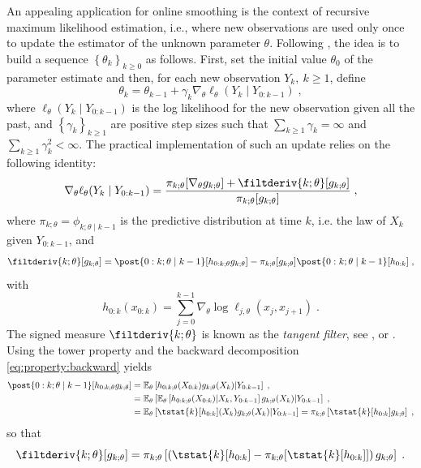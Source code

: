 \documentclass[12pt]{article}
\newcommand{\md}[1]{g_{#1}}
\newcommand{\logllh}[1]{\ell_{#1}}
\newcommand{\pred}[1]{\pi_{#1}}
\newcommand{\parvec}{\theta}
\newcommand{\af}[1]{h_{#1}}
\newcommand{\deriv}{\nabla_{\parvec}}
\newcommand{\eqsp}{\;}
\newcommand{\qg}[1]{\ell_{#1}}
\begin{document}
An appealing application for online smoothing is the context of recursive maximum likelihood estimation, i.e., where new observations are used only once to update the estimator of the unknown parameter $\parvec$. Following \cite{legland1997recursive}, the idea is to build a sequence $\left\lbrace\parvec_k\right\rbrace_{k\geqslant 0}$ as follows. First, set the initial value $\parvec_0$ of the parameter estimate and then, for each new observation $Y_{k},~k\geqslant 1$, define
\begin{equation}
\theta_{k} = \theta_{k-1} + \gamma_k \deriv \logllh{\parvec}(Y_k \mid Y_{0:k - 1}) \eqsp,  \label{eq:RMLE:update}
\end{equation}
where $\logllh{\parvec}(Y_k \mid Y_{0:k - 1})$ is the log likelihood for the new observation given all the past, and $\left\lbrace\gamma_k\right\rbrace_{k\geqslant 1}$ are positive step sizes such that $\sum_{k \geqslant 1}\gamma_k = \infty$ and $\sum_{k \geqslant 1}\gamma_k^2 < \infty$. The practical implementation of such an update relies on the following identity:
\begin{equation}
\deriv \logllh{\parvec}(Y_k \mid Y_{0:k - 1})  
=  \frac{\pred{k;\parvec}[\deriv \md{k;\parvec}] + \filtderiv{k;\parvec}[\md{k;\parvec}]}{\pred{k;\parvec}[\md{k;\parvec}]}\eqsp,
\label{eq:online:gradient}
\end{equation}
where $\pred{k;\parvec} = \phi_{k;\parvec \mid k - 1}$ is the predictive distribution at time $k$, i.e. the law of $X_k$ given $Y_{0:k-1}$,   and 
$$\filtderiv{k;\parvec}[\md{k;\parvec}] = \post{0:k;\parvec \mid k - 1} [\af{0:k;\parvec} \md{k;\parvec}] - \pred{k;\parvec}[\md{k;\parvec}]  \post{0:k;\parvec \mid k - 1 }[\af{0:k}]\eqsp,$$
with
\begin{equation}
\label{eq:complete:gradient:log}
\af{0:k}(x_{0:k}) =  \sum_{j = 0}^{k - 1} \deriv\log \qg{j, \parvec}(x_j,x_{j+1})\eqsp.
\end{equation}
The signed measure $\filtderiv{k;\parvec}$ is known as the \textit{tangent filter}, see \cite[Chapter~10]{cappe2005inference}, \cite{delmoral2015uniform} or \cite{olsson2020particle}. 
Using the tower property  and the backward decomposition \eqref{eq:property:backward} yields
\begin{align*}
\post{0:k;\parvec \mid k - 1} [\af{0:k;\parvec} \md{k;\parvec}]  &= \mathbb{E}_\parvec\left[\af{0:k;\parvec}(X_{0:k}) \md{k;\parvec}(X_k)\middle|Y_{0:k-1}\right]\eqsp,\\
&= \mathbb{E}_\parvec\left[\mathbb{E}_\parvec\left[\af{0:k;\parvec}(X_{0:k}) \middle|X_k,Y_{0:k-1}\right]\md{k;\parvec}(X_k)\middle|Y_{0:k-1}\right]\eqsp,\\
&= \mathbb{E}_\parvec\left[\tstat{k} [\af{0:k}](X_k) \md{k;\parvec}(X_k)\middle|Y_{0:k-1}\right] =  \pred{k;\parvec}\left[\tstat{k} [\af{0:k}]\md{k;\parvec}\right]\eqsp,
\end{align*}
so that
\begin{equation} 
\label{eq:tangent:identity}
\filtderiv{k;\parvec}[\md{k;\parvec}] = \pred{k;\parvec}\left[\left(\tstat{k} [\af{0:k}] - \pred{k;\parvec}[\tstat{k}[\af{0:k}]]\right) \md{k;\parvec}\right]\eqsp.
\end{equation}
\end{document}
